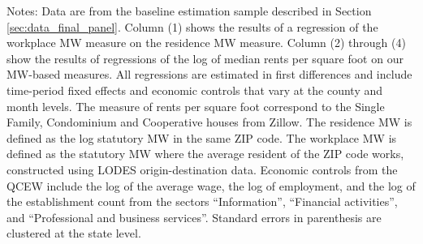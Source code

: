 \begin{table}[hbt!]
    \begin{minipage}{.95\textwidth} \footnotesize
        \vspace{2mm}
        Notes:
        Data are from the baseline estimation sample described in Section 
        \ref{sec:data_final_panel}.
        Column (1) shows the results of a regression of the workplace MW measure
        on the residence MW measure.
        Column (2) through (4) show the results of regressions of the log of 
        median rents per square foot on our MW-based measures.
        All regressions are estimated in first differences and include 
        time-period fixed effects and economic controls that vary at the 
        county and month levels.
        The measure of rents per square foot correspond to the Single Family, 
        Condominium and Cooperative houses from Zillow.
        The residence MW is defined as the log statutory MW in the same ZIP code.
        The workplace MW is defined as the statutory MW where the average 
        resident of the ZIP code works, constructed using LODES 
        origin-destination data.
        Economic controls from the QCEW include the log of the average wage, 
        the log of employment, and the log of the establishment count from the 
        sectors ``Information'', ``Financial activities'', and ``Professional
        and business services''.
        Standard errors in parenthesis are clustered at the state level.
    \end{minipage}
\end{table}
